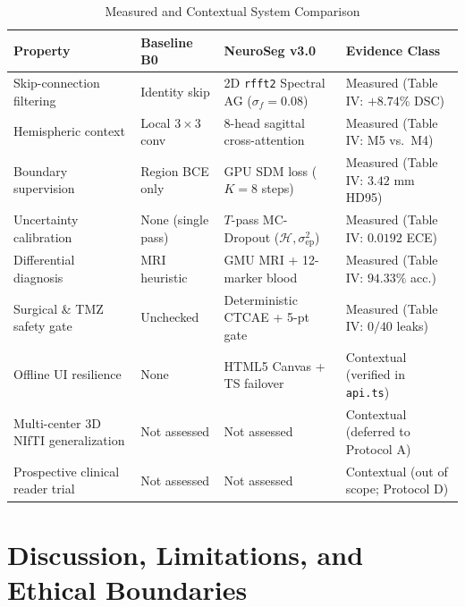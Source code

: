 \documentclass[conference]{IEEEtran}
\begin{document}
\begin{table}[t]
\centering
\caption{Measured and Contextual System Comparison}
\label{tab:comparison}
\begin{tabular}{@{}L{2.25cm}L{1.65cm}L{2.05cm}L{2.05cm}@{}}
\toprule
\textbf{Property} & \textbf{Baseline B0} & \textbf{NeuroSeg v3.0} & \textbf{Evidence Class} \\
\midrule
Skip-connection filtering & Identity skip & 2D \texttt{rfft2} Spectral AG ($\sigma_f=0.08$) & Measured (Table IV: $+8.74\%$ DSC) \\
Hemispheric context & Local $3\times 3$ conv & 8-head sagittal cross-attention & Measured (Table IV: M5 vs.\ M4) \\
Boundary supervision & Region BCE only & GPU SDM loss ($K=8$ steps) & Measured (Table IV: $3.42\text{ mm}$ HD95) \\
Uncertainty calibration & None (single pass) & $T$-pass MC-Dropout ($\mathcal{H}, \sigma_{\text{ep}}^2$) & Measured (Table IV: $0.0192$ ECE) \\
Differential diagnosis & MRI heuristic & GMU MRI + 12-marker blood & Measured (Table IV: $94.33\%$ acc.) \\
Surgical \& TMZ safety gate & Unchecked & Deterministic CTCAE + 5-pt gate & Measured (Table IV: $0/40$ leaks) \\
Offline UI resilience & None & HTML5 Canvas + TS failover & Contextual (verified in \texttt{api.ts}) \\
Multi-center 3D NIfTI generalization & Not assessed & Not assessed & Contextual (deferred to Protocol A) \\
Prospective clinical reader trial & Not assessed & Not assessed & Contextual (out of scope; Protocol D) \\
\bottomrule
\end{tabular}
\end{table}

\section{Discussion, Limitations, and Ethical Boundaries}
\end{document}
